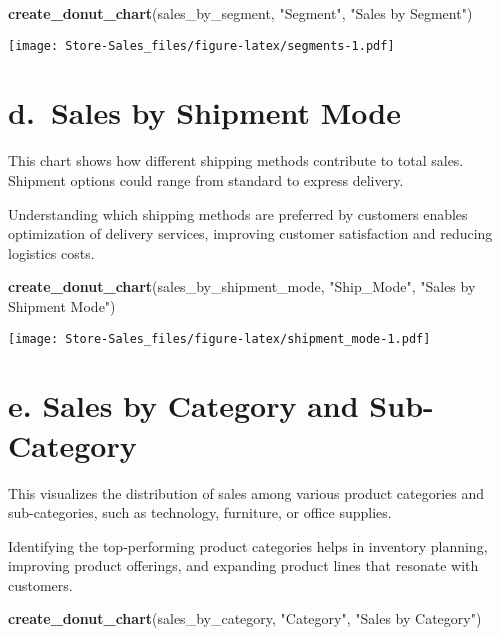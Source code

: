 \documentclass[
]{article}
\newenvironment{Shaded}{\begin{snugshade}}{\end{snugshade}}
\newcommand{\FunctionTok}[1]{\textcolor[rgb]{0.13,0.29,0.53}{\textbf{#1}}}
\newcommand{\NormalTok}[1]{#1}
\newcommand{\StringTok}[1]{\textcolor[rgb]{0.31,0.60,0.02}{#1}}
\begin{document}
\begin{Shaded}
\begin{Highlighting}[]
\FunctionTok{create\_donut\_chart}\NormalTok{(sales\_by\_segment, }\StringTok{"Segment"}\NormalTok{, }\StringTok{"Sales by Segment"}\NormalTok{)}
\end{Highlighting}
\end{Shaded}

\texttt{[image: Store-Sales\_files/figure-latex/segments-1.pdf]}

\hypertarget{d.-sales-by-shipment-mode}{%
\section{d.~Sales by Shipment Mode}\label{d.-sales-by-shipment-mode}}

This chart shows how different shipping methods contribute to total
sales. Shipment options could range from standard to express delivery.

Understanding which shipping methods are preferred by customers enables
optimization of delivery services, improving customer satisfaction and
reducing logistics costs.

\begin{Shaded}
\begin{Highlighting}[]
\FunctionTok{create\_donut\_chart}\NormalTok{(sales\_by\_shipment\_mode, }\StringTok{"Ship\_Mode"}\NormalTok{, }\StringTok{"Sales by Shipment Mode"}\NormalTok{)}
\end{Highlighting}
\end{Shaded}

\texttt{[image: Store-Sales\_files/figure-latex/shipment\_mode-1.pdf]}

\hypertarget{e.-sales-by-category-and-sub-category}{%
\section{e. Sales by Category and
Sub-Category}\label{e.-sales-by-category-and-sub-category}}

This visualizes the distribution of sales among various product
categories and sub-categories, such as technology, furniture, or office
supplies.

Identifying the top-performing product categories helps in inventory
planning, improving product offerings, and expanding product lines that
resonate with customers.

\begin{Shaded}
\begin{Highlighting}[]
\FunctionTok{create\_donut\_chart}\NormalTok{(sales\_by\_category, }\StringTok{"Category"}\NormalTok{, }\StringTok{"Sales by Category"}\NormalTok{)}
\end{Highlighting}
\end{Shaded}
\end{document}
